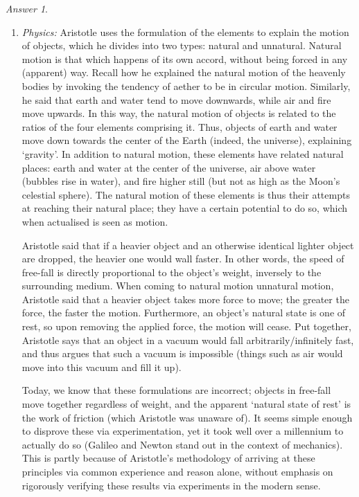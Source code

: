\documentclass[11pt]{article}
\theoremstyle{remark}
\newtheorem*{answer}{Answer}
\begin{document}
\begin{answer}
\begin{enumerate}
            \item \textit{Physics:} Aristotle uses the formulation of the elements to
            explain the motion of objects, which he divides into two types: natural
            and unnatural. Natural motion is that which happens of its own accord,
            without being forced in any (apparent) way. Recall how he explained the
            natural motion of the heavenly bodies by invoking the tendency of aether
            to be in circular motion. Similarly, he said that earth and water tend to
            move downwards, while air and fire move upwards. In this way, the natural
            motion of objects is related to the ratios of the four elements
            comprising it. Thus, objects of earth and water move down towards the
            center of the Earth (indeed, the universe), explaining `gravity'. In
            addition to natural motion, these elements have related natural places:
            earth and water at the center of the universe, air above water (bubbles
            rise in water), and fire higher still (but not as high as the Moon's
            celestial sphere). The natural motion of these elements is thus their
            attempts at reaching their natural place; they have a certain potential
            to do so, which when actualised is seen as motion.

            Aristotle said that if a heavier object and an otherwise identical
            lighter object are dropped, the heavier one would wall faster. In other
            words, the speed of free-fall is directly proportional to the object's
            weight, inversely to the surrounding medium. When coming to natural
            motion unnatural motion, Aristotle said that a heavier object takes more
            force to move; the greater the force, the faster the motion.
            Furthermore, an object's natural state is one of rest, so upon removing
            the applied force, the motion will cease. Put together, Aristotle says
            that an object in a vacuum would fall arbitrarily/infinitely fast, and
            thus argues that such a vacuum is impossible (things such as air would
            move into this vacuum and fill it up).

            Today, we know that these formulations are incorrect; objects in
            free-fall move together regardless of weight, and the apparent `natural
            state of rest' is the work of friction (which Aristotle was unaware of).
            It seems simple enough to disprove these via experimentation, yet it took
            well over a millennium to actually do so (Galileo and Newton stand out in
            the context of mechanics). This is partly because of Aristotle's
            methodology of arriving at these principles via common experience and
            reason alone, without emphasis on rigorously verifying these results via
            experiments in the modern sense.


\end{enumerate}
\end{answer}
\end{document}
